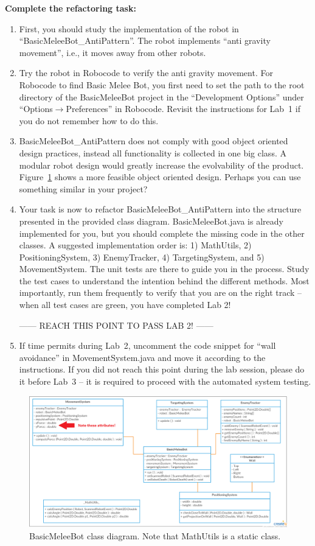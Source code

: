\documentclass{scrreprt}
\begin{document}
\textbf{Complete the refactoring task:}
\begin{enumerate}
\item First, you should study the implementation of the robot in ``BasicMeleeBot_AntiPattern''. The robot implements ``anti gravity movement'', i.e., it moves away from other robots. 
\item Try the robot in Robocode to verify the anti gravity movement. For Robocode to find Basic Melee Bot, you first need to set the path to the root directory of the BasicMeleeBot project in the ``Development Options'' under ``Options$\rightarrow$Preferences'' in Robocode. Revisit the instructions for Lab~1 if you do not remember how to do this.
\item BasicMeleeBot_AntiPattern does not comply with good object oriented design practices, instead all functionality is collected in one big class. A modular robot design would greatly increase the evolvability of the product. Figure~\ref{fig:classDiagram} shows a more feasible object oriented design. Perhaps you can use something similar in your project?
\item Your task is now to refactor BasicMeleeBot_AntiPattern into the structure presented in the provided class diagram. BasicMeleeBot.java is already implemented for you, but you should complete the missing code in the other classes. A suggested implementation order is: 1) MathUtils, 2) PositioningSystem, 3) EnemyTracker, 4) TargetingSystem, and 5) MovementSystem. The unit tests are there to guide you in the process. Study the test cases to understand the intention behind the different methods. Most importantly, run them frequently to verify that you are on the right track -- when all test cases are green, you have completed Lab 2!
\begin{center}
------ REACH THIS POINT TO PASS LAB 2! ------
\end{center}
\item If time permits during Lab~2, uncomment the code snippet for ``wall avoidance'' in MovementSystem.java and move it according to the instructions. If you did not reach this point during the lab session, please do it before Lab~3 -- it is required to proceed with the automated system testing.
\end{enumerate}

\begin{figure}
\centering
\includegraphics[width=1.1\textwidth]{figures/BasicMeleeBotClassDiagram.png}
\caption{BasicMeleeBot class diagram. Note that MathUtils is a static class.}
\label{fig:classDiagram}
\end{figure}
\end{document}
